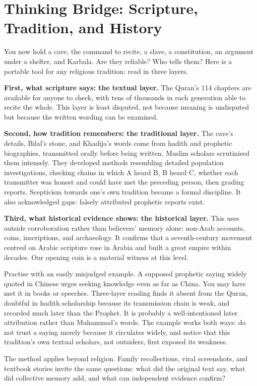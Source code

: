 \section[Thinking Bridge: Three Layers of Reading]{Thinking Bridge: Scripture, Tradition, and History}
You now hold a cave, the command to recite, a slave, a constitution, an argument under a shelter, and Karbala. Are they reliable? Who tells them? Here is a portable tool for any religious tradition: read in three layers.

\textbf{First, what scripture says: the textual layer.} The Quran's 114 chapters are available for anyone to check, with tens of thousands in each generation able to recite the whole. This layer is least disputed, not because meaning is undisputed but because the written wording can be examined.

\textbf{Second, how tradition remembers: the traditional layer.} The cave's details, Bilal's stone, and Khadija's words come from hadith and prophetic biographies, transmitted orally before being written. Muslim scholars scrutinised them intensely. They developed methods resembling detailed population investigations, checking chains in which A heard B, B heard C, whether each transmitter was honest and could have met the preceding person, then grading reports. Scepticism towards one's own tradition became a formal discipline. It also acknowledged gaps: falsely attributed prophetic reports exist.

\textbf{Third, what historical evidence shows: the historical layer.} This uses outside corroboration rather than believers' memory alone: non-Arab accounts, coins, inscriptions, and archaeology. It confirms that a seventh-century movement centred on Arabic scripture rose in Arabia and built a great empire within decades. Our opening coin is a material witness at this level.

Practise with an easily misjudged example. A supposed prophetic saying widely quoted in Chinese urges seeking knowledge even as far as China. You may have met it in books or speeches. Three-layer reading finds it absent from the Quran, doubtful in hadith scholarship because its transmission chain is weak, and recorded much later than the Prophet. It is probably a well-intentioned later attribution rather than Muhammad's words. The example works both ways: do not trust a saying merely because it circulates widely, and notice that this tradition's own textual scholars, not outsiders, first exposed its weakness.

The method applies beyond religion. Family recollections, viral screenshots, and textbook stories invite the same questions: what did the original text say, what did collective memory add, and what can independent evidence confirm?

